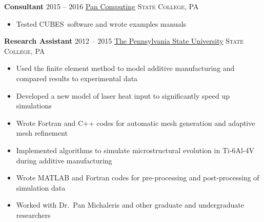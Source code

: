 \documentclass[10.5pt,letterpaper]{article}
\begin{document}
\noindent \textbf{Consultant} \hfill 2015 -- 2016 \break
\href{http://www.pancomputing.com}{Pan Computing} \hfill \textsc{State College, PA}
\begin{itemize}
	\setlength{\parskip}{0em}
	\item Tested CUBES\textsuperscript\textregistered\ software and wrote examples manuals
\end{itemize}

\noindent \textbf{Research Assistant} \hfill 2012 -- 2015 \break
\href{https://www.psu.edu}{The Pennsylvania State University} \hfill \textsc{State College, PA}
\begin{itemize}
	\setlength{\parskip}{0em}
	\item Used the finite element method to model additive manufacturing and compared results to experimental data
	\item Developed a new model of laser heat input to significantly speed up simulations
	\item Wrote Fortran and C++ codes for automatic mesh generation and adaptive mesh refinement
	\item Implemented algorithms to simulate microstructural evolution in Ti-6Al-4V during additive manufacturing
	\item Wrote MATLAB and Fortran codes for pre-processing and post-processing of simulation data
	\item Worked with Dr.\ Pan Michaleris and other graduate and undergraduate researchers
\end{itemize}
\end{document}
